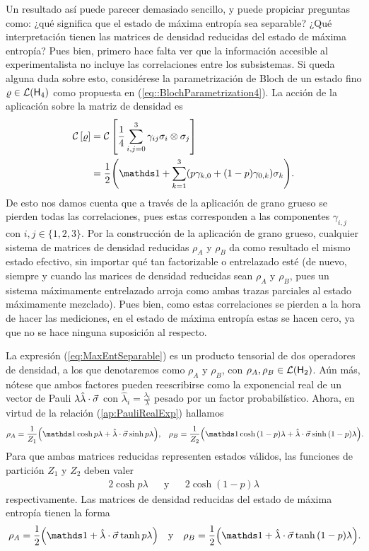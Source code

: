 Un resultado así puede parecer demasiado sencillo, y puede propiciar preguntas como: ¿qué significa que el estado de máxima entropía sea separable? ¿Qué interpretación tienen las matrices de densidad reducidas del estado de máxima entropía? Pues bien, primero hace falta ver que la información accesible al experimentalista no incluye las correlaciones entre los subsistemas. Si queda alguna duda sobre esto, considérese la parametrización de Bloch de un estado fino $\varrho\in\mathcal{L}({\sf H}_{4})$ como propuesta en (\ref{eq::BlochParametrization4}). La acción de la aplicación sobre la matriz de densidad es
\begin{align*}
    \CG{\varrho}&=\CG{\frac{1}{4}\sum_{i,j=0}^{3}\gamma_{ij}\pauli{i}\otimes \pauli{j}}\\
    &=\frac{1}{2}\qty(\Id+\sum_{k=1}^{3}(p\gamma_{k,0}+(1-p)\gamma_{0,k})\sigma_{k}).
\end{align*}
De esto nos damos cuenta que a través de la aplicación de grano grueso se pierden todas las correlaciones, pues estas corresponden a las componentes $\gamma_{i,j}$ con $i,j\in\{1,2,3\}$. Por la construcción de la aplicación de grano grueso, cualquier sistema de matrices de densidad reducidas $\rho_{A}$ y $\rho_{B}$ da como resultado el mismo estado efectivo, sin importar qué tan factorizable o entrelazado esté (de nuevo, siempre y cuando las marices de densidad reducidas sean $\rho_{A}$ y $\rho_{B}$, pues un sistema máximamente entrelazado arroja como ambas trazas parciales al estado máximamente mezclado). Pues bien, como estas correlaciones se pierden a la hora de hacer las mediciones, en el estado de máxima entropía estas se hacen cero, ya que no se hace ninguna suposición al respecto. 

La expresión (\ref{eq:MaxEntSeparable}) es un producto tensorial de dos operadores de densidad, a los que denotaremos como $\rho_{A}$ y $\rho_{B}$, con $\rho_{A}, \rho_{B}\in\mathcal{L}({\sf H}_{2})$. Aún más, nótese que ambos factores pueden reescribirse como la exponencial real de un vector de Pauli $\lambda\hat{\lambda}\cdot\vec{\sigma}$ con $\hat{\lambda}_{i}=\frac{\lambda_{i}}{\lambda}$ pesado por un factor probabilístico. Ahora, en virtud de la relación (\ref{ap:PauliRealExp}) hallamos
\begin{align*}
    \rho_{A}=\frac{1}{Z_{1}}\qty(\Id\cosh{p\lambda}+\paulivec{\lambda}\sinh{p\lambda}), && \rho_{B}=\frac{1}{Z_{2}}\qty(\Id\cosh{(1-p)\lambda}+\paulivec{\lambda}\sinh{(1-p)\lambda})\rlap{.}
\end{align*}
Para que ambas matrices reducidas representen estados válidos, las funciones de partición $Z_{1}$ y $Z_{2}$ deben valer
\begin{align*}
    2\cosh{p\lambda} && \text{y} && 2\cosh{(1-p)\lambda}
\end{align*}
respectivamente. Las matrices de densidad reducidas del estado de máxima entropía tienen la forma
\begin{align}
    \rho_{A}=\frac{1}{2}\qty(\Id+\paulivec{\lambda}\tanh{p\lambda}) && \text{y} && \rho_{B}=\frac{1}{2}\qty(\Id+\paulivec{\lambda}\tanh{(1-p)\lambda})\rlap{.}
\end{align}

